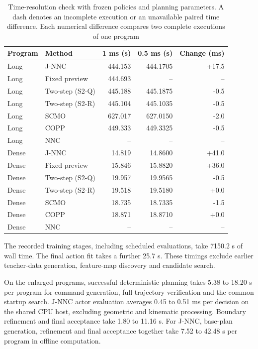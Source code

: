 \documentclass[pdflatex,sn-apa]{sn-jnl}
\begin{document}
\begin{table}[htbp]
\centering
\caption{Time-resolution check with frozen policies and planning parameters. A dash denotes an incomplete execution or an unavailable paired time difference. Each numerical difference compares two complete executions of one program}
\label{tab:resolution}
\small
\begin{tabular}{llrrr}
\toprule
Program & Method & 1 ms (s) & 0.5 ms (s) & Change (ms) \\
\midrule
Long & J-NNC & 444.153 & 444.1705 & +17.5 \\
Long & Fixed preview & 444.693 & -- & -- \\
Long & Two-step (S2-Q) & 445.188 & 445.1875 & -0.5 \\
Long & Two-step (S2-R) & 445.104 & 445.1035 & -0.5 \\
Long & SCMO & 627.017 & 627.0150 & -2.0 \\
Long & COPP & 449.333 & 449.3325 & -0.5 \\
Long & NNC & -- & -- & -- \\
\midrule
Dense & J-NNC & 14.819 & 14.8600 & +41.0 \\
Dense & Fixed preview & 15.846 & 15.8820 & +36.0 \\
Dense & Two-step (S2-Q) & 19.957 & 19.9565 & -0.5 \\
Dense & Two-step (S2-R) & 19.518 & 19.5180 & +0.0 \\
Dense & SCMO & 18.735 & 18.7335 & -1.5 \\
Dense & COPP & 18.871 & 18.8710 & +0.0 \\
Dense & NNC & -- & -- & -- \\
\bottomrule
\end{tabular}
\end{table}

The recorded training stages, including scheduled evaluations, take 7150.2{} s of wall time. The final action fit takes a further 25.7{} s. These timings exclude earlier teacher-data generation, feature-map discovery and candidate search.

On the enlarged programs, successful deterministic planning takes 5.38{} to 18.20{} s per program for command generation, full-trajectory verification and the common startup search. J-NNC actor evaluation averages 0.45{} to 0.51{} ms per decision on the shared CPU host, excluding geometric and kinematic processing. Boundary refinement and final acceptance take 1.80{} to 11.16{} s. For J-NNC, base-plan generation, refinement and final acceptance together take 7.52{} to 42.48{} s per program in offline computation.
\end{document}
